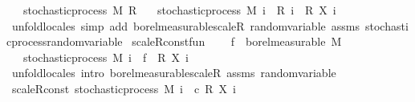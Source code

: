 \begin{isabellebody}
\ \ \ {\isachardoublequoteopen}stochastic{\isacharunderscore}{\kern0pt}process\ M\ R{\isachardoublequoteclose}\isanewline
\ \ \ {\isachardoublequoteopen}stochastic{\isacharunderscore}{\kern0pt}process\ M\ {\isacharparenleft}{\kern0pt}{\isasymlambda}i\ {\isasymxi}{\isachardot}{\kern0pt}\ {\isacharparenleft}{\kern0pt}R\ i\ {\isasymxi}{\isacharparenright}{\kern0pt}\ {\isacharasterisk}{\kern0pt}\isactrlsub R\ {\isacharparenleft}{\kern0pt}X\ i\ {\isasymxi}{\isacharparenright}{\kern0pt}{\isacharparenright}{\kern0pt}{\isachardoublequoteclose}\isanewline
%
\isadelimproof
\ \ %
\endisadelimproof
%
\isatagproof
{}\isamarkupfalse%
\ {\isacharparenleft}{\kern0pt}unfold{\isacharunderscore}{\kern0pt}locales{\isacharparenright}{\kern0pt}\ {\isacharparenleft}{\kern0pt}simp\ add{\isacharcolon}{\kern0pt}\ borel{\isacharunderscore}{\kern0pt}measurable{\isacharunderscore}{\kern0pt}scaleR\ random{\isacharunderscore}{\kern0pt}variable\ assms\ stochastic{\isacharunderscore}{\kern0pt}process{\isachardot}{\kern0pt}random{\isacharunderscore}{\kern0pt}variable{\isacharparenright}{\kern0pt}%
\endisatagproof
{\isafoldproof}%
%
\isadelimproof
\isanewline
%
\endisadelimproof
\isanewline
{}\isamarkupfalse%
\ scaleR{\isacharunderscore}{\kern0pt}const{\isacharunderscore}{\kern0pt}fun{\isacharcolon}{\kern0pt}\ \isanewline
\ \ \ {\isachardoublequoteopen}f\ {\isasymin}\ borel{\isacharunderscore}{\kern0pt}measurable\ M{\isachardoublequoteclose}\ \isanewline
\ \ \ {\isachardoublequoteopen}stochastic{\isacharunderscore}{\kern0pt}process\ M\ {\isacharparenleft}{\kern0pt}{\isasymlambda}i\ {\isasymxi}{\isachardot}{\kern0pt}\ f\ {\isasymxi}\ {\isacharasterisk}{\kern0pt}\isactrlsub R\ {\isacharparenleft}{\kern0pt}X\ i\ {\isasymxi}{\isacharparenright}{\kern0pt}{\isacharparenright}{\kern0pt}{\isachardoublequoteclose}\isanewline
%
\isadelimproof
\ \ %
\endisadelimproof
%
\isatagproof
{}\isamarkupfalse%
\ {\isacharparenleft}{\kern0pt}unfold{\isacharunderscore}{\kern0pt}locales{\isacharcomma}{\kern0pt}\ intro\ borel{\isacharunderscore}{\kern0pt}measurable{\isacharunderscore}{\kern0pt}scaleR\ assms\ random{\isacharunderscore}{\kern0pt}variable{\isacharparenright}{\kern0pt}%
\endisatagproof
{\isafoldproof}%
%
\isadelimproof
\isanewline
%
\endisadelimproof
\isanewline
{}\isamarkupfalse%
\ scaleR{\isacharunderscore}{\kern0pt}const{\isacharcolon}{\kern0pt}\ {\isachardoublequoteopen}stochastic{\isacharunderscore}{\kern0pt}process\ M\ {\isacharparenleft}{\kern0pt}{\isasymlambda}i\ {\isasymxi}{\isachardot}{\kern0pt}\ c\ {\isacharasterisk}{\kern0pt}\isactrlsub R\ {\isacharparenleft}{\kern0pt}X\ i\ {\isasymxi}{\isacharparenright}{\kern0pt}{\isacharparenright}{\kern0pt}{\isachardoublequoteclose}%

\end{isabellebody}
